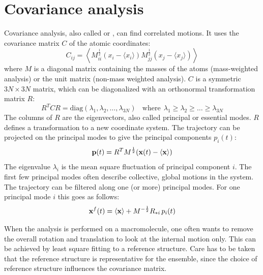 \section{Covariance analysis}
\label{sec:covanal}
Covariance analysis, also called
or 
\cite{Amadei93}{,} can find correlated motions.
It uses the covariance matrix $C$ of the atomic coordinates:
\begin{equation}
C_{ij} = \left \langle 
M_{ii}^{\frac{1}{2}} (x_i - \langle x_i \rangle)
M_{jj}^{\frac{1}{2}}  (x_j - \langle x_j \rangle)
\right \rangle
\end{equation}
where $M$ is a diagonal matrix containing the masses of the atoms
(mass-weighted analysis) or the unit matrix (non-mass weighted analysis).
$C$ is a symmetric $3N \times 3N$ matrix, which can be diagonalized with
an orthonormal transformation matrix $R$:
\begin{equation}
R^T C R = \mbox{diag}(\lambda_1,\lambda_2,\ldots,\lambda_{3N})
~~~~\mbox{where}~~\lambda_1 \geq \lambda_2 \geq \ldots \geq \lambda_{3N}
\end{equation}
The columns of $R$ are the eigenvectors, also called principal or
essential modes.
$R$ defines a transformation to a new coordinate system. The trajectory
can be projected on the principal modes to give the principal components
$p_i(t)$:
\begin{equation}
{\bf p}(t) = R^T M^{\frac{1}{2}} ({\bf x}(t) - \langle {\bf x} \rangle)
\end{equation}
The eigenvalue $\lambda_i$ is the mean square fluctuation of principal
component $i$. The first few principal modes often describe 
collective, global motions in the system.
The trajectory can be filtered along one (or more) principal modes.
For one principal mode $i$ this goes as follows:
\begin{equation}
{\bf x}^f(t) =
\langle {\bf x} \rangle + M^{-\frac{1}{2}} R_{*i} \, p_i(t)
\end{equation}

When the analysis is performed on a macromolecule, one often wants to
remove the overall rotation and translation to look at the internal motion
only. This can be achieved by least square fitting to a reference structure.
Care has to be taken that the reference structure is representative for the
ensemble, since the choice of reference structure influences the covariance
matrix.

